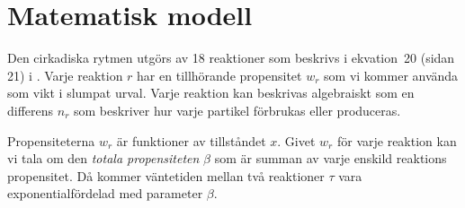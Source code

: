 \section{Matematisk modell}
\label{sec:modell}

Den cirkadiska rytmen utgörs av 18 reaktioner som beskrivs i ekvation~20 (sidan 21) i \cite{hellander}. Varje reaktion $r$ har en tillhörande propensitet $w_r$ som vi kommer använda som vikt i slumpat urval. Varje reaktion kan beskrivas algebraiskt som en differens $n_r$ som beskriver hur varje partikel förbrukas eller produceras.

Propensiteterna $w_r$ är funktioner av tillståndet $x$. Givet $w_r$ för varje reaktion kan vi tala om den \emph{totala propensiteten} $\beta$ som är summan av varje enskild reaktions propensitet. Då kommer väntetiden mellan två reaktioner $\tau$ vara exponentialfördelad med parameter $\beta$.